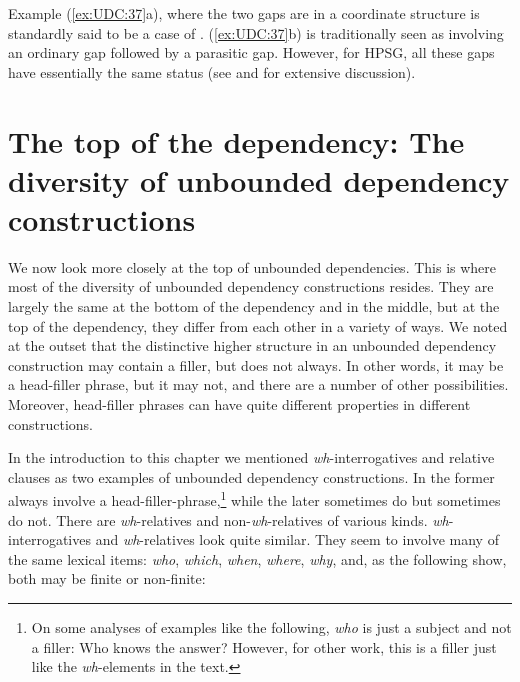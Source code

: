 \documentclass[output=paper
,notxmath 
 	        ,biblatex
                ,babelshorthands
                ,newtxmath
                ,draftmode
                ,colorlinks, citecolor=brown
]{langscibook}
\begin{document}
\noindent
Example (\ref{ex:UDC:37}a), where the two gaps are in a coordinate structure
is standardly said to be a case of . (\ref{ex:UDC:37}b) is traditionally seen as involving an
ordinary gap followed by a parasitic gap. However, for HPSG, all these
gaps have essentially the same status (see \citealt{Levine:Hukari:06}
and \citealt{Chaves:12} for extensive discussion).

\section{The top of the dependency: The diversity of unbounded
dependency constructions}
\label{sec:UDC:Top}

We now look more closely at the top of unbounded dependencies. This is
where most of the diversity of unbounded dependency constructions
resides. They are largely the same at the bottom of the dependency and
in the middle, but at the top of the dependency, they differ from each
other in a variety of ways. We noted at the outset that the
distinctive higher structure in an unbounded dependency construction
may contain a filler, but does not always. In other words, it may be a
head-filler phrase, but it may not, and there are a number of other
possibilities. Moreover, head-filler phrases can have quite different
properties in different constructions.

In the introduction to this chapter we mentioned
\emph{wh}-interrogatives and relative clauses as two examples of
unbounded dependency constructions. In  the former always involve
a head-filler-phrase,\footnote{On some analyses of examples like the
  following, \emph{who} is just a subject and not a filler:
\ea
Who knows the answer?
\z
However, for other work, this is a filler just like the
  \emph{wh}-elements in the text.} while the later sometimes do but
sometimes do not. There are \emph{wh}-relatives and
non-\emph{wh}-relatives of various kinds. 
\emph{wh}-interrogatives and \emph{wh}-relatives look quite similar.
They seem to involve many of the same lexical items: \emph{who},
\emph{which}, \emph{when}, \emph{where}, \emph{why}, and, as the
following show, both may be finite or non-finite:

\eal
\label{ex:UDC:38}

\zl

\eal
\label{ex:UDC:39}
\zl
\end{document}
